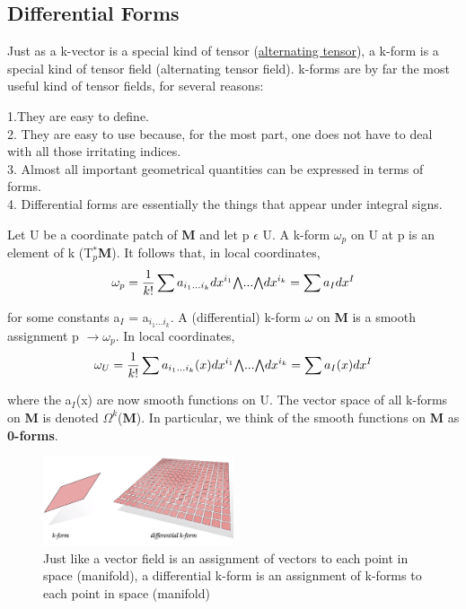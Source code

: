 \subsection{Differential Forms}
Just as a k-vector is a special kind of tensor (\href{https://web2.clarkson.edu/projects/subramanian/ch490/notes/Alternating%20Unit%20Tensor.pdf}{alternating tensor}), a k-form is a
special kind of tensor field (alternating tensor field).  
k-forms are by far the most useful kind of tensor fields, for several reasons:

1.They are easy to define. \\
2. They are easy to use because, for the most part, one does not have to deal with all those irritating indices. \\
3. Almost all important geometrical quantities can be expressed in terms of forms. \\
4. Differential forms are essentially the things that appear under integral signs.

Let U be a coordinate patch of \textbf{M} and let p $\epsilon$ U. A k-form $\omega_p$ on U at p is an element of k (T$_p^*$\textbf{M}). 
It follows that, in local coordinates,
\begin{equation}
    \omega_p = \frac{1}{k!}\sum a_{i_1...i_k}dx^{i_1}\exterior...\exterior dx^{i_k} = \sum a_I dx^I
\end{equation}

for some constants a$_I$ = a$_{i_1...i_k}$. A (differential) k-form $\omega$ on \textbf{M} is a smooth
assignment p $\rightarrow \omega_p$. In local coordinates,
\begin{equation}
    \omega_U = \frac{1}{k!}\sum a_{i_1...i_k}(x)dx^{i_1}\exterior...\exterior dx^{i_k} = \sum a_I(x) dx^I
\end{equation}

where the a$_I$(x) are now smooth functions on U. 
The vector space of all k-forms on \textbf{M} is denoted $\Omega^k$(\textbf{M}). 
In particular, we think of the smooth functions on \textbf{M} as \textbf{0-forms}.

\begin{figure}[h]
    \begin{center}
        \includegraphics[width=0.5\textwidth]{figures/differential_k-form.png}
        \caption{Just like a vector field is an assignment of vectors to each point in space (manifold), 
        a differential k-form is an assignment of k-forms to each point in space (manifold)}
    \end{center}
\end{figure}

